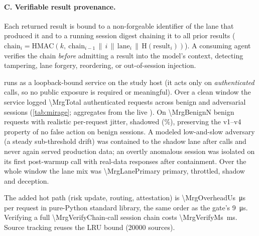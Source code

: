 \paragraph{C. Verifiable result provenance.}
Each returned result is bound to a non-forgeable identifier of the lane that
produced it and to a running session digest chaining it to all prior results
($\text{chain}_i = \mathrm{HMAC}(k,\ \text{chain}_{i-1}\,\|\,i\,\|\,
\text{lane}_i\,\|\,\mathrm{H}(\text{result}_i))$). A consuming agent verifies
the chain \emph{before} admitting a result into the model's context, detecting
tampering, lane forgery, reordering, or out-of-session injection.

\mirage{} runs as a loopback-bound service on the study host (it acts only on
\emph{authenticated} calls, so no public exposure is required or meaningful).
Over a clean window the service logged \num{\MrgTotal} authenticated requests
across benign and adversarial sessions (\cref{tab:mirage}; aggregates from the
live ). On \num{\MrgBenignN} benign requests with
realistic per-request jitter, \mirage{} shadowed \MrgBenignShadow{}
(\MrgBenignRate\%), preserving the v1--v4 property of no false action on benign
sessions. A modeled low-and-slow adversary (a steady sub-threshold drift) was
contained to the shadow lane after \MrgSlowFirst{} calls and never again served
production data; an overtly anomalous session was isolated on its first
post-warmup call with \MrgOvertLeak{} real-data responses after containment.
Over the whole window the lane mix was \num{\MrgLanePrimary} primary,
\MrgLaneThrottled{} throttled, \MrgLaneShadow{} shadow and \MrgLaneDeception{}
deception.

The added hot path (risk update, routing, attestation) is
\SI{\MrgOverheadUs}{\micro\second} per request in pure-Python standard library,
the same order as the \sys{} gate's \SI{9}{\micro\second}. Verifying a full
\num{\MrgVerifyChain}-call session chain costs \SI{\MrgVerifyMs}{\milli\second}.
Source tracking reuses the \sys{} LRU bound (\num{20000} sources).

